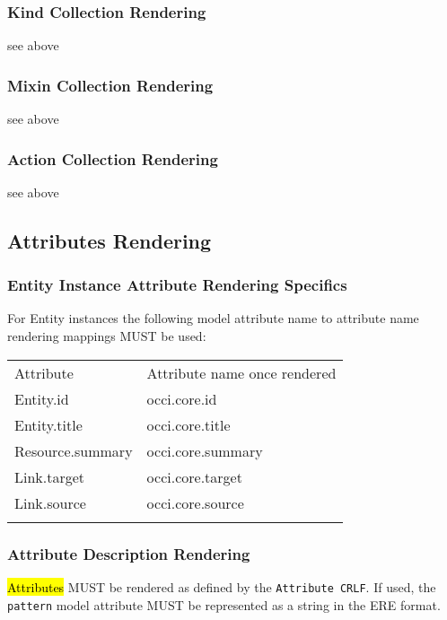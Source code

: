 \documentclass[10pt,a4paper]{article}
\begin{document}
\subsubsection{Kind Collection Rendering}

see above

\subsubsection{Mixin Collection Rendering}

see above

\subsubsection{Action Collection Rendering}

see above

\subsection{Attributes Rendering}

\subsubsection{Entity Instance Attribute Rendering Specifics}

For Entity instances the following model attribute name to attribute name rendering mappings MUST be used:

 {
	\begin{tabular}{ll}
		\toprule
			Attribute & Attribute name once rendered \\
		\colrule
			Entity.id & occi.core.id \\
			Entity.title & occi.core.title \\
			Resource.summary & occi.core.summary \\
			Link.target & occi.core.target \\
			Link.source & occi.core.source \\
		\botrule
	\end{tabular}
}

\subsubsection{Attribute Description Rendering}
\label{sec:format_attribute_description}

\hl{Attributes} MUST be rendered as defined by the {\tt Attribute CRLF}. If used, the {\tt pattern} model attribute
MUST be represented as a string in the ERE \cite{ere} format.
\end{document}
